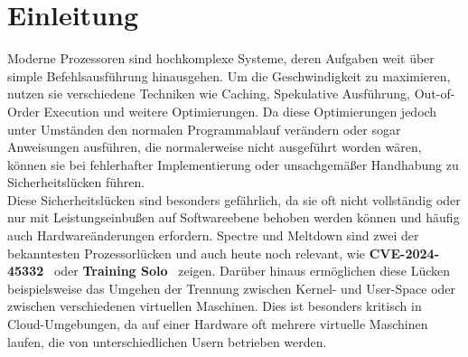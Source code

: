 \section[Einleitung]{Einleitung}
\label{sec:einleitung}
Moderne Prozessoren sind hochkomplexe Systeme, deren Aufgaben weit über simple Befehlsausführung hinausgehen.
Um die Geschwindigkeit zu maximieren, nutzen sie verschiedene Techniken wie Caching, Spekulative Ausführung, Out-of-Order Execution und weitere Optimierungen.
Da diese Optimierungen jedoch unter Umständen den normalen Programmablauf verändern oder sogar Anweisungen ausführen, die normalerweise nicht ausgeführt worden wären, können sie bei fehlerhafter Implementierung oder unsachgemäßer Handhabung zu Sicherheitslücken führen.\\
Diese Sicherheitslücken sind besonders gefährlich, da sie oft nicht vollständig oder nur mit Leistungseinbußen auf Softwareebene behoben werden können und häufig auch Hardwareänderungen erfordern.
Spectre und Meltdown sind zwei der bekanntesten Prozessorlücken und auch heute noch relevant, wie \textbf{CVE-2024-45332}~\cite{cve_2024_45332,bprc_sec25} oder \textbf{Training Solo}~\cite{training_solo} zeigen.
Darüber hinaus ermöglichen diese Lücken beispielsweise das Umgehen der Trennung zwischen Kernel- und User-Space oder zwischen verschiedenen virtuellen Maschinen.
Dies ist besonders kritisch in Cloud-Umgebungen, da auf einer Hardware oft mehrere virtuelle Maschinen laufen, die von unterschiedlichen Usern betrieben werden.